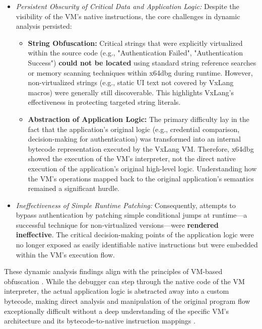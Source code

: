 \begin{itemize}
\begin{itemize}
        \item \textit{Persistent Obscurity of Critical Data and Application Logic:} Despite the visibility of the VM's native instructions, the core challenges in dynamic analysis persisted:
            \begin{itemize}
                \item \textbf{String Obfuscation:} Critical strings that were explicitly virtualized within the source code (e.g., "Authentication Failed", "Authentication Success") \textbf{could not be located} using standard string reference searches or memory scanning techniques within x64dbg during runtime. However, non-virtualized strings (e.g., static UI text not covered by VxLang macros) were generally still discoverable. This highlights VxLang's effectiveness in protecting targeted string literals.
                \item \textbf{Abstraction of Application Logic:} The primary difficulty lay in the fact that the application's original logic (e.g., credential comparison, decision-making for authentication) was transformed into an internal bytecode representation executed by the VxLang VM. Therefore, x64dbg showed the execution of the VM's interpreter, not the direct native execution of the application's original high-level logic. Understanding how the VM's operations mapped back to the original application's semantics remained a significant hurdle.
            \end{itemize}

        \item \textit{Ineffectiveness of Simple Runtime Patching:} Consequently, attempts to bypass authentication by patching simple conditional jumps at runtime—a successful technique for non-virtualized versions—were \textbf{rendered ineffective}. The critical decision-making points of the application logic were no longer exposed as easily identifiable native instructions but were embedded within the VM's execution flow.
    \end{itemize}
    These dynamic analysis findings align with the principles of VM-based obfuscation \cite{Sikorski2012, Ore06}. While the debugger can step through the native code of the VM interpreter, the actual application logic is abstracted away into a custom bytecode, making direct analysis and manipulation of the original program flow exceptionally difficult without a deep understanding of the specific VM's architecture and its bytecode-to-native instruction mappings \cite{Sal18}.
\end{itemize}


